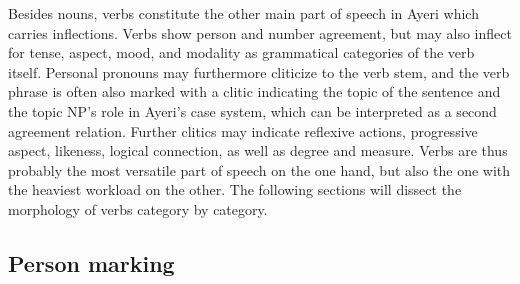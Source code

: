 Besides nouns, verbs constitute the other main part of speech in Ayeri which
carries inflections. Verbs show person and number agreement, but may also
inflect for tense, aspect, mood, and modality as grammatical categories of the
verb itself. Personal pronouns may furthermore cliticize to the verb stem, and
the verb phrase is often also marked with a clitic indicating the topic of the
sentence and the topic NP's role in Ayeri's case system, which can be
interpreted as a second agreement relation. Further clitics may indicate
reflexive actions, progressive aspect, likeness, logical connection, as well
as degree and measure. Verbs are thus probably the most versatile part of
speech on the one hand, but also the one with the heaviest workload on the
other. The following sections will dissect the morphology of verbs category by
category.

\subsection{Person marking}
\label{subsec:persnumagr}

